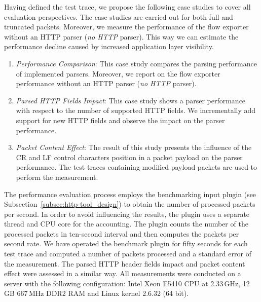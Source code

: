 
Having defined the test trace, we propose the following case studies to cover all evaluation perspectives. The case studies are carried out for both full and truncated packets. Moreover, we measure the performance of the flow exporter without an HTTP parser (\emph{no HTTP} parser). This way we can estimate the performance decline caused by increased application layer visibility.

\begin{enumerate}
    \item \emph{Performance Comparison}: This case study compares the parsing performance of implemented parsers. Moreover, we report on the flow exporter performance without an HTTP parser (\emph{no HTTP} parser).
    \item \emph{Parsed HTTP Fields Impact}: This case study shows a parser performance with respect to the number of supported HTTP fields. We incrementally add support for new HTTP fields and observe the impact on the parser performance.
    \item \emph{Packet Content Effect}: The result of this study presents the influence of the CR and LF control characters position in a packet payload on the parser performance. The test traces containing modified payload packets are used to perform the measurement.
\end{enumerate}

The performance evaluation process employs the benchmarking input plugin (see Subsection~\ref{subsec:http-tool_design}) to obtain the number of processed packets per second. 
In order to avoid influencing the results, the plugin uses a separate thread and CPU core for the accounting. The plugin counts the number of the processed packets in ten-second interval and then computes the packets per second rate. We have operated the benchmark plugin for fifty seconds for each test trace and computed a number of packets processed and a standard error of the measurement. The parsed HTTP header fields impact and packet content effect were assessed in a similar way. All measurements were conducted on a server with the following configuration: Intel Xeon E5410 CPU at 2.33\,GHz, 12\,GB 667\,MHz DDR2 RAM and Linux kernel 2.6.32 (64 bit).

